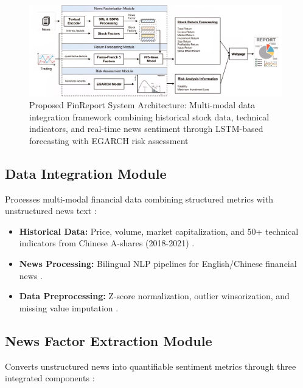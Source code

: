\documentclass[3p,times,procedia]{elsarticle}
\begin{document}
\begin{figure}[!ht]
    \centering
    \includegraphics[width=0.98\textwidth]{flowchart.jpg}
    \caption{Proposed FinReport System Architecture: Multi-modal data integration framework combining historical stock data, technical indicators, and real-time news sentiment through LSTM-based forecasting with EGARCH risk assessment}
    \label{fig:workflow_diagram}
\end{figure}

\subsection{{Data Integration Module}}
\vspace{-2pt}
Processes multi-modal financial data combining structured metrics with unstructured news text \cite{Harvey2016}:
\begin{itemize}\setlength{\itemsep}{0pt}
\item \textbf{Historical Data:} Price, volume, market capitalization, and 50+ technical indicators from Chinese A-shares (2018-2021) \cite{FinReportDataset2025}.
\item \textbf{News Processing:} Bilingual NLP pipelines for English/Chinese financial news \cite{Loughran2011}.
\item \textbf{Data Preprocessing:} Z-score normalization, outlier winsorization, and missing value imputation \cite{Fischer2018}.
\end{itemize}

\subsection{{News Factor Extraction Module}}
\vspace{-2pt}
Converts unstructured news into quantifiable sentiment metrics through three integrated components \cite{TETLOCK2007}:
\end{document}
